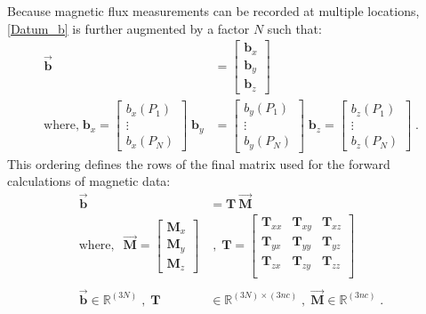 Because magnetic flux measurements can be recorded at multiple locations, \ref{Datum_b} is further augmented by a factor $N$ such that:
\begin{equation}
\begin{split}
\vec{\mathbf{ b}} &= 
	\begin{bmatrix}
	\mathbf{b}_x \\
	\mathbf{b}_y \\
	\mathbf{b}_z 
	\end{bmatrix} \\
\text{where,}\;
{\mathbf{ b}_x} = 
	\begin{bmatrix}
	b_x(P_1) \\
	\vdots \\
	b_x(P_N) 
	\end{bmatrix}\;
	{\mathbf{ b}_y} &= 
	\begin{bmatrix}
	b_y(P_1) \\
	\vdots \\
	b_y(P_N) 
	\end{bmatrix}\;
	{\mathbf{ b}_z} = 
	\begin{bmatrix}
	b_z(P_1) \\
	\vdots \\
	b_z(P_N) 
	\end{bmatrix}\;.
	\end{split}
\end{equation} 
This ordering defines the rows of the final matrix used for the forward calculations of magnetic data:
\begin{equation} \label{Fwr_b}
\begin{split}
	\vec{\mathbf{ b}}& =  \mathbf{T}\:\vec{\mathbf{M}} \\
	\text{where}, \; \; \vec {\mathbf{M}} =  
	\begin{bmatrix}
	\mathbf{M}_x \\
	\mathbf{M}_y \\
	\mathbf{M}_z 
	\end{bmatrix}&\;,\;
	\mathbf{T} = 
	\begin{bmatrix} 
		\mathbf{T}_{xx}		&	 \mathbf{T}_{xy}	& \mathbf{T}_{xz}  \\
		\mathbf{T}_{yx}		&	 \mathbf{T}_{yy}	& \mathbf{T}_{yz}  \\
		\mathbf{T}_{zx}		&	 \mathbf{T}_{zy}		& \mathbf{T}_{zz}  \\
	\end{bmatrix} \\ \\
 	\vec{\mathbf{ b}} \in \mathbb{R}^{ (3N)} \;,\; \mathbf{T}& \in \mathbb{R}^{(3N) \times (3nc)} \;,\; \vec{\mathbf{M}} \in \mathbb{R}^{ (3nc)}\;.
\end{split}
\end{equation}


